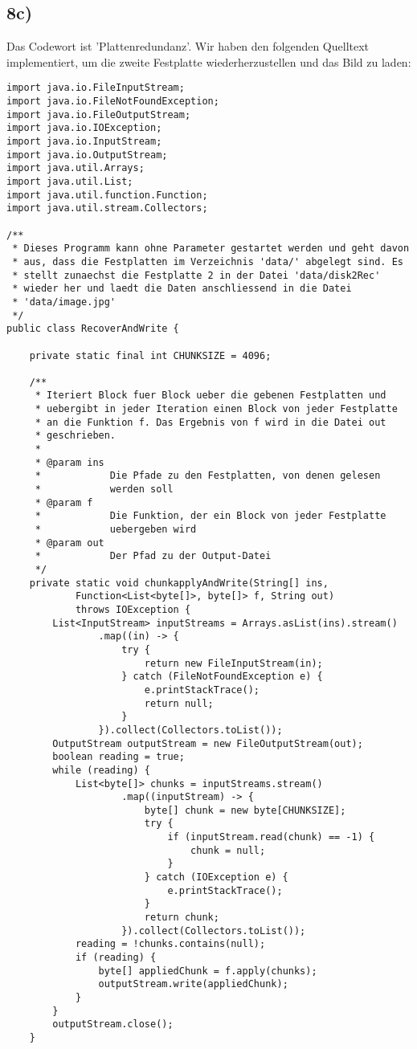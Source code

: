 \documentclass[ngerman]{fbi-aufgabenblatt}
\begin{document}
\subsection*{8c)}
Das Codewort ist 'Plattenredundanz'. Wir haben den folgenden Quelltext implementiert, um die zweite Festplatte wiederherzustellen und das Bild zu laden:
\begin{lstlisting}
import java.io.FileInputStream;
import java.io.FileNotFoundException;
import java.io.FileOutputStream;
import java.io.IOException;
import java.io.InputStream;
import java.io.OutputStream;
import java.util.Arrays;
import java.util.List;
import java.util.function.Function;
import java.util.stream.Collectors;

/**
 * Dieses Programm kann ohne Parameter gestartet werden und geht davon
 * aus, dass die Festplatten im Verzeichnis 'data/' abgelegt sind. Es
 * stellt zunaechst die Festplatte 2 in der Datei 'data/disk2Rec'
 * wieder her und laedt die Daten anschliessend in die Datei
 * 'data/image.jpg'
 */
public class RecoverAndWrite {

	private static final int CHUNKSIZE = 4096;

	/**
	 * Iteriert Block fuer Block ueber die gebenen Festplatten und
	 * uebergibt in jeder Iteration einen Block von jeder Festplatte
	 * an die Funktion f. Das Ergebnis von f wird in die Datei out
	 * geschrieben.
	 * 
	 * @param ins
	 *            Die Pfade zu den Festplatten, von denen gelesen
	 *            werden soll
	 * @param f
	 *            Die Funktion, der ein Block von jeder Festplatte
	 *            uebergeben wird
	 * @param out
	 *            Der Pfad zu der Output-Datei
	 */
	private static void chunkapplyAndWrite(String[] ins,
			Function<List<byte[]>, byte[]> f, String out)
			throws IOException {
		List<InputStream> inputStreams = Arrays.asList(ins).stream()
				.map((in) -> {
					try {
						return new FileInputStream(in);
					} catch (FileNotFoundException e) {
						e.printStackTrace();
						return null;
					}
				}).collect(Collectors.toList());
		OutputStream outputStream = new FileOutputStream(out);
		boolean reading = true;
		while (reading) {
			List<byte[]> chunks = inputStreams.stream()
					.map((inputStream) -> {
						byte[] chunk = new byte[CHUNKSIZE];
						try {
							if (inputStream.read(chunk) == -1) {
								chunk = null;
							}
						} catch (IOException e) {
							e.printStackTrace();
						}
						return chunk;
					}).collect(Collectors.toList());
			reading = !chunks.contains(null);
			if (reading) {
				byte[] appliedChunk = f.apply(chunks);
				outputStream.write(appliedChunk);
			}
		}
		outputStream.close();
	}


\end{lstlisting}
\end{document}
